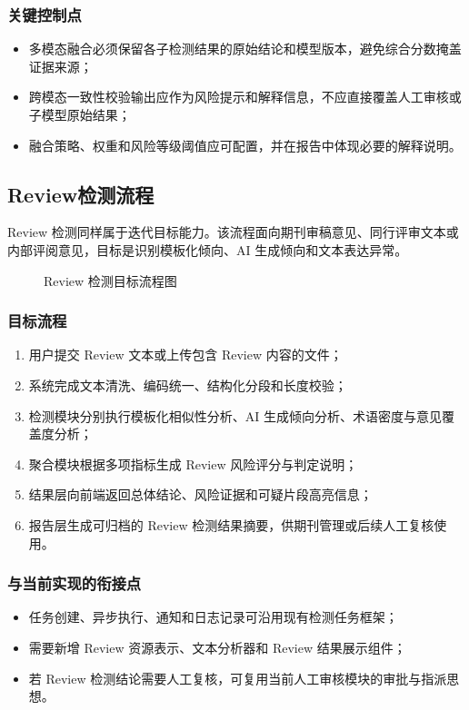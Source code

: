 \subsubsection{关键控制点}
\begin{itemize}[leftmargin=2em]
    \item 多模态融合必须保留各子检测结果的原始结论和模型版本，避免综合分数掩盖证据来源；
    \item 跨模态一致性校验输出应作为风险提示和解释信息，不应直接覆盖人工审核或子模型原始结果；
    \item 融合策略、权重和风险等级阈值应可配置，并在报告中体现必要的解释说明。
\end{itemize}

\subsection{Review检测流程}
Review 检测同样属于迭代目标能力。该流程面向期刊审稿意见、同行评审文本或内部评阅意见，目标是识别模板化倾向、AI 生成倾向和文本表达异常。

\begin{figure}[H]
    \centering
    \resizebox{0.98\textwidth}{!}{}
    \caption{Review 检测目标流程图}
\end{figure}

\subsubsection{目标流程}
\begin{enumerate}[leftmargin=2em]
    \item 用户提交 Review 文本或上传包含 Review 内容的文件；
    \item 系统完成文本清洗、编码统一、结构化分段和长度校验；
    \item 检测模块分别执行模板化相似性分析、AI 生成倾向分析、术语密度与意见覆盖度分析；
    \item 聚合模块根据多项指标生成 Review 风险评分与判定说明；
    \item 结果层向前端返回总体结论、风险证据和可疑片段高亮信息；
    \item 报告层生成可归档的 Review 检测结果摘要，供期刊管理或后续人工复核使用。
\end{enumerate}

\subsubsection{与当前实现的衔接点}
\begin{itemize}[leftmargin=2em]
    \item 任务创建、异步执行、通知和日志记录可沿用现有检测任务框架；
    \item 需要新增 Review 资源表示、文本分析器和 Review 结果展示组件；
    \item 若 Review 检测结论需要人工复核，可复用当前人工审核模块的审批与指派思想。
\end{itemize}

